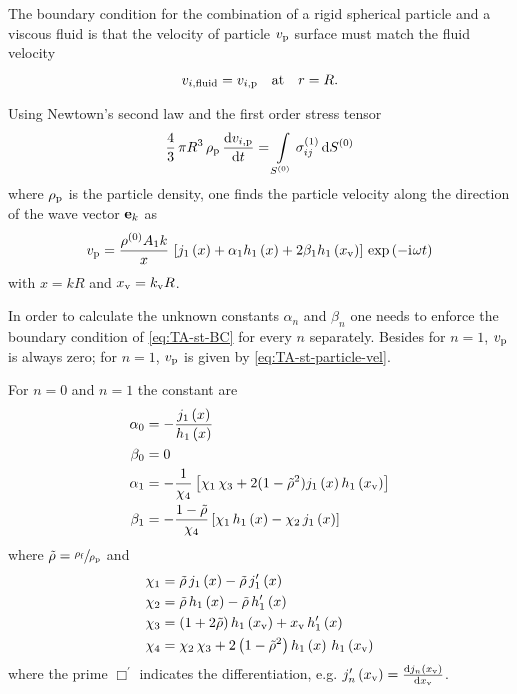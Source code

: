 The boundary condition for the combination of a rigid spherical particle and a 
viscous fluid is that the velocity of particle $v_{\mathrm{p}}$ surface must 
match the fluid velocity
\begin{equation}
  v_{i,\mathrm{fluid}} = v_{i,\mathrm{p}}\quad\text{at}\quad r = R.
  \label{eq:TA-st-BC}
\end{equation}

Using Newtown's second law and the first order stress tensor
\begin{equation}
  \frac{4}{3}\,\pi 
  R^{3}\,\rho_{\mathrm{p}}\,\dv{v_{i,\mathrm{p}}}{t} = 
  \int\limits_{S^{(0)}}\sigma_{ij}^{(1)}\dd{  S^{(0)}  }
  \label{eq:TA-st-newton}
\end{equation}
where $\rho_{\mathrm{p}}$ is the particle density, one finds the particle 
velocity along the direction of the wave vector $\vb{e}_{k}$ as
\begin{equation}
  v_{\mathrm{p}} = \frac{\rho^{(0)}A_{1}k}{x}\,
  \left[
    j_{1}\left(x\right) + \alpha_{1}h_{1}\left(x\right) + 2\beta_{1}h_{1}\left(x_{\mathrm{v}}\right)
  \right]
  \,\exp\left( -\mathrm{i}\mkern1mu\omega t \right)
  \label{eq:TA-st-particle-vel}
\end{equation}
with $x=kR$ and $x_{\mathrm{v}}=k_{\mathrm{v}}R$.

In order to calculate the unknown constants $\alpha_{n}$ and $\beta_{n}$ one 
needs to enforce the boundary condition of \cref{eq:TA-st-BC} for every $n$ 
separately. Besides for $n=1$, $v_{\mathrm{p}}$ is always zero; for $n=1$, 
$v_{\mathrm{p}}$ is given by \cref{eq:TA-st-particle-vel}.

For $n=0$ and $n=1$ the constant are
\begin{subequations}
\begin{align}
  \alpha_{0} & = -\frac{j_{1}\left(x\right)}{h_{1}\left(x\right)} \\
  \beta_{0} & = 0 \\
  \alpha_{1} & = - \frac{1}{\chi_{4}} \left[ \chi_{1}\,\chi_{3} + 
  2(1-\tilde{\rho}^{2})j_{1}\left(x\right)h_{1}\left(x_{\mathrm{v}}\right) \right]
    \label{eq:TA-alpha-one}\\
    \beta_{1} &= - \frac{1-\tilde{\rho}}{\chi_{4}} \left[ \chi_{1}\,h_{1}\left(x\right) - 
    \chi_{2}\,j_{1}\left(x\right) \right]
    \label{eq:TA-beta-one}
\end{align}
\end{subequations}
where $\tilde{\rho} = \sfrac{\rho_{\mathrm{f}}}{\rho_{\mathrm{p}}}$ and
\begin{subequations}
\begin{align}
\chi_{1} & = \tilde{\rho}\,j_{1}\left(x\right) - \tilde{\rho}\,j^{\prime}_{1}\left(x\right)
\label{eq:TA-chi-one} \\
\chi_{2} & = \tilde{\rho}\,h_{1}\left(x\right) - \tilde{\rho}\,h^{\prime}_{1}\left(x\right)
\label{eq:TA-chi-two} \\
\chi_{3} & = \left( 1 + 2 \tilde{\rho}\right)h_{1}\left(x_{\mathrm{v}}\right) + 
x_{\mathrm{v}}\,h^{\prime}_{1}\left(x\right)
\label{eq:TA-chi-three} \\
\chi_{4} & = \chi_{2}\,\chi_{3} + 2\left( 1 - \tilde{\rho}^{2} \right) 
h_{1}\left(x\right)\,h_{1}\left(x_{\mathrm{v}}\right)
\label{eq:TA-chi-four}
\end{align}
\end{subequations}
where the prime $\Box^{\prime}$ indicates the differentiation, e.g. 
$j^{\prime}_{n}\left(x_{\mathrm{v}}\right)=\dv{j_{n}\left(x_{\mathrm{v}}\right)}{x_{\mathrm{v}}}$.

